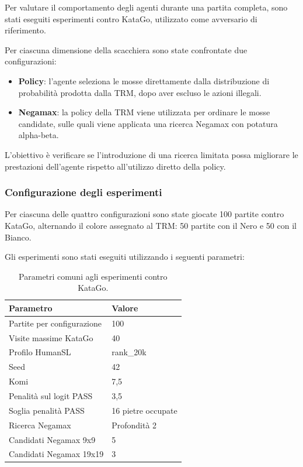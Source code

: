 Per valutare il comportamento degli agenti durante una partita completa, sono stati eseguiti esperimenti contro KataGo, utilizzato come avversario di riferimento.

Per ciascuna dimensione della scacchiera sono state confrontate due configurazioni:
\begin{itemize}
    \item \textbf{Policy}: l'agente seleziona le mosse direttamente dalla distribuzione di probabilità prodotta dalla TRM, dopo aver escluso le azioni illegali.
    \item \textbf{Negamax}: la policy della TRM viene utilizzata per ordinare le mosse candidate, sulle quali viene applicata una ricerca Negamax con potatura alpha-beta.
\end{itemize}

L'obiettivo è verificare se l'introduzione di una ricerca limitata possa migliorare le prestazioni dell'agente rispetto all'utilizzo diretto della policy.

\subsubsection{Configurazione degli esperimenti}

Per ciascuna delle quattro configurazioni sono state giocate 100 partite contro KataGo, alternando il colore assegnato al TRM: 50 partite con il Nero e 50 con il Bianco.

Gli esperimenti sono stati eseguiti utilizzando i seguenti parametri:

\begin{table}[htbp]
    \centering
    \caption{Parametri comuni agli esperimenti contro KataGo.}
    \label{tab:katago_common_config}
    \begin{tabular}{ll}
        \hline
        \textbf{Parametro}         & \textbf{Valore}    \\
        \hline
        Partite per configurazione & 100                \\
        Visite massime KataGo      & 40                 \\
        Profilo HumanSL            & rank\_20k          \\
        Seed                       & 42                 \\
        Komi                       & 7,5                \\
        Penalità sul logit PASS    & 3,5                \\
        Soglia penalità PASS       & 16 pietre occupate \\
        Ricerca Negamax            & Profondità 2       \\
        Candidati Negamax 9x9      & 5                  \\
        Candidati Negamax 19x19    & 3                  \\
        \hline
    \end{tabular}
\end{table}

